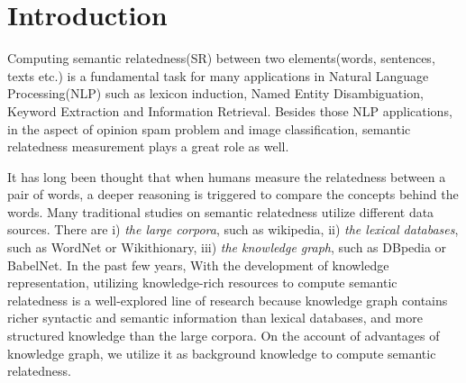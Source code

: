\section{Introduction}
Computing semantic relatedness(SR) between two elements(words, sentences,
texts etc.) is a fundamental task for many applications in Natural Language
Processing(NLP) such as lexicon induction\cite{aaai/QadirMGL15}, Named 
Entity Disambiguation\cite{acl/HanZ10}, Keyword Extraction
\cite{ijcai/ZhangFW13} and Information Retrieval\cite{acl/GurevychMZ07}. 
Besides those NLP applications, in the aspect of opinion spam problem\cite{www/SandulescuE15}
and image classification\cite{iwcs/LeongM11}, semantic relatedness measurement plays a great role as well. 

It has long been thought that when humans measure the relatedness between
a pair of words, a deeper reasoning is triggered to compare the concepts
behind the words. Many traditional studies on semantic relatedness
utilize different data sources. There are
i) \emph{the large corpora}, such as wikipedia\cite{ijcai/GabrilovichM07},
ii) \emph{the lexical databases}, such as WordNet\cite{acl/Pucher07} or Wikithionary\cite{aaai/ZeschMG08}, 
iii) \emph{the knowledge graph}, such as DBpedia\cite{aaai/NavigliP12} or BabelNet\cite{aaai/NavigliP12}.
In the past few years, With the development of knowledge representation, utilizing knowledge-rich resources to compute semantic 
relatedness is a well-explored line of research because knowledge graph contains richer syntactic and semantic information
than lexical databases, and more structured knowledge than the large corpora.
On the account of advantages of knowledge graph, we utilize it as background 
knowledge to compute semantic relatedness.


